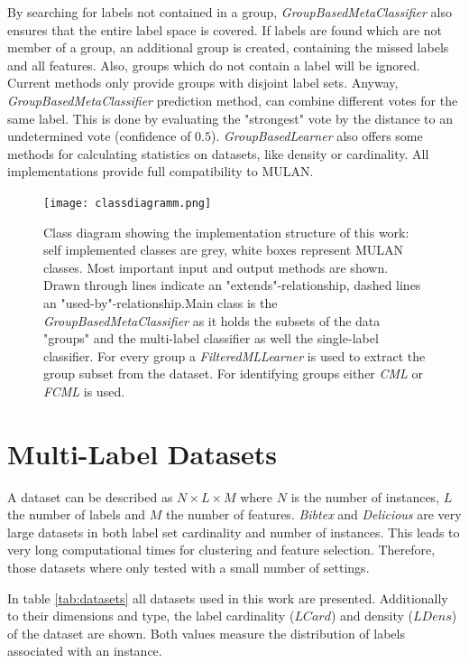 		By searching for labels not contained in a group, \textit{GroupBasedMetaClassifier} also ensures that the entire label space is covered. If labels are found which are not member of a group, an additional group is created, containing the missed labels and all features. Also, groups which do not contain a label will be ignored. Current methods only provide groups with disjoint label sets. Anyway, \textit{GroupBasedMetaClassifier} prediction method, can combine different votes for the same label. This is done by evaluating the "strongest" vote by the distance to an undetermined vote (confidence of $0.5$). \textit{GroupBasedLearner} also offers some methods for calculating statistics on datasets, like density or cardinality. All implementations provide full compatibility to \mbox{MULAN}.

		\begin{figure}
			\centering
			\texttt{[image: classdiagramm.png]} 
			\caption{Class diagram showing the implementation structure of this work: self implemented classes are grey, white boxes represent \mbox{MULAN} classes. Most important input and output methods are shown. Drawn through lines indicate an "extends"-relationship, dashed lines an "used-by"-relationship.\newline Main class is the \textit{GroupBasedMetaClassifier} as it holds the subsets of the data "groups" and the multi-label classifier as well the single-label classifier. For every group a \textit{FilteredMLLearner} is used to extract the group subset from the dataset. For identifying groups either \textit{CML} or \textit{FCML} is used.}
		    \label{img:classDiag}
		\end{figure}

	\section{Multi-Label Datasets}
	\label{sec:datasets}

		A dataset can be described as $ N \times L \times M$ where $N$ is the number of instances, $ L $ the number of labels and $ M $ the number of features. \textit{Bibtex} and \textit{Delicious} are very large datasets in both label set cardinality and number of instances. This leads to very long computational times for clustering and feature selection. Therefore, those datasets where only tested with a small number of settings.

		In table \ref{tab:datasets} all datasets used in this work are presented. Additionally to their dimensions and type, the label cardinality ($LCard$) and  density ($LDens$) \cite{Tsoumakas07} of the dataset are shown. Both values measure the distribution of labels associated with an instance.

